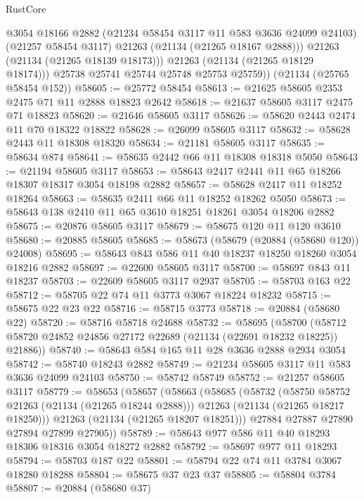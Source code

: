 \begin{lexlean}{RustCore}
\begin{coremodule}
              @3054
              @18166
              @2882
              (@21234 @58454 @3117 @11 @583 @3636 @24099 @24103)
              (@21257 @58454 @3117)
              @21263
              (@21134 (@21265 @18167 @2888)))
            @21263
            (@21134 (@21265 @18139 @18173)))
          @21263
          (@21134 (@21265 @18129 @18174)))
        @25738
        @25741
        @25744
        @25748
        @25753
        @25759))
    (@21134 (@25765 @58454 @152))
@58605 := @25772 @58454
@58613 := @21625 @58605 @2353 @2475 @71 @11 @2888 @18823 @2642
@58618 := @21637 @58605 @3117 @2475 @71 @18823
@58620 := @21646 @58605 @3117
@58626 := @58620 @2443 @2474 @11 @70 @18322 @18822
@58628 := @26099 @58605 @3117
@58632 := @58628 @2443 @11 @18308 @18320
@58634 := @21181 @58605 @3117
@58635 := @58634 @874
@58641 := @58635 @2442 @66 @11 @18308 @18318 @5050
@58643 := @21194 @58605 @3117
@58653 := @58643 @2417 @2441 @11 @65 @18266 @18307 @18317 @3054 @18198 @2882
@58657 := @58628 @2417 @11 @18252 @18264
@58663 := @58635 @2411 @66 @11 @18252 @18262 @5050
@58673 := @58643 @138 @2410 @11 @65 @3610 @18251 @18261 @3054 @18206 @2882
@58675 := @20876 @58605 @3117
@58679 := @58675 @120 @11 @120 @3610
@58680 := @20885 @58605
@58685 := @58673 (@58679 (@20884 (@58680 @120)) @24008)
@58695 := @58643 @843 @586 @11 @40 @18237 @18250 @18260 @3054 @18216 @2882
@58697 := @22600 @58605 @3117
@58700 := @58697 @843 @11 @18237
@58703 := @22609 @58605 @3117 @2937
@58705 := @58703 @163 @22
@58712 := @58705 @22 @74 @11 @3773 @3067 @18224 @18232
@58715 := @58675 @22 @23 @22
@58716 := @58715 @3773
@58718 := @20884 (@58680 @22)
@58720 := @58716 @58718 @24688
@58732 := @58695
    (@58700 (@58712 @58720 @24852 @24856 @27172 @22689 (@21134 (@22691 @18232 @18225)) @21886))
@58740 := @58643 @584 @165 @11 @28 @3636 @2888 @2934 @3054
@58742 := @58740 @18243 @2882
@58749 := @21234 @58605 @3117 @11 @583 @3636 @24099 @24103
@58750 := @58742 @58749
@58752 := @21257 @58605 @3117
@58779 := @58653
    (@58657
      (@58663
        (@58685
          (@58732
            (@58750 @58752 @21263 (@21134 (@21265 @18244 @2888)))
            @21263
            (@21134 (@21265 @18217 @18250)))
          @21263
          (@21134 (@21265 @18207 @18251)))
        @27884
        @27887
        @27890
        @27894
        @27899
        @27905))
@58789 := @58643 @977 @586 @11 @40 @18293 @18306 @18316 @3054 @18272 @2882
@58792 := @58697 @977 @11 @18293
@58794 := @58703 @187 @22
@58801 := @58794 @22 @74 @11 @3784 @3067 @18280 @18288
@58804 := @58675 @37 @23 @37
@58805 := @58804 @3784
@58807 := @20884 (@58680 @37)

\end{coremodule}
\end{lexlean}
